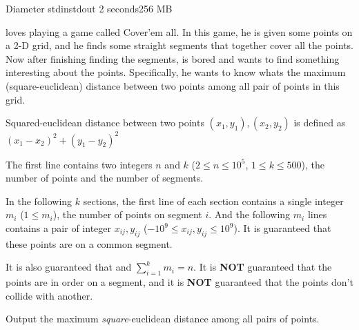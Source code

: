 \begin{problem}{Diameter}
{stdin}{stdout}
{2 seconds}{256 MB}{}

\pittoresque loves playing a game called Cover'em all. In this game, he is given some points on a 2-D grid, and he finds some straight segments that together cover all the points. Now after finishing finding the segments, \pittoresque is bored and wants to find something interesting about the points. Specifically, he wants to know whats the maximum (square-euclidean) distance between two points among all pair of points in this grid.

Squared-euclidean distance between two points $(x_1, y_1), (x_2, y_2)$ is defined as $(x_1 - x_2)^2 + (y_1 - y_2)^2$

\InputFile

The first line contains two integers $n$ and $k$ ($2 \le n \le 10^5$, $1 \le k \le 500$), the number of points and the number of segments.

In the following $k$ sections, the first line of each section contains a single integer $m_i$ ($1 \le m_i$), the number of points on segment $i$. And the following $m_i$ lines contains a pair of integer $x_{ij}, y_{ij}$ ($-10^9 \le x_{ij}, y_{ij} \le 10^9$). It is guaranteed that these points are on a common segment.

It is also guaranteed that and $\sum_{i = 1}^{k} m_i = n$. It is \textbf{NOT} guaranteed that the points are in order on a segment, and it is \textbf{NOT} guaranteed that the points don't collide with another. 

\OutputFile

Output the maximum \textit{square}-euclidean distance among all pairs of points. 

\Examples

\begin{example}
%
\end{example}

\begin{example}
%
\end{example}



\end{problem}
